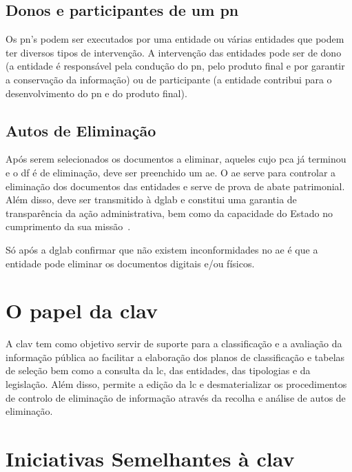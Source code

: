 \subsection{Donos e participantes de um \acrlong{pn}}

Os \acrshort{pn}'s podem ser executados por uma entidade ou várias entidades que podem ter diversos tipos de 
intervenção. A intervenção das entidades pode ser de dono (a entidade é responsável pela condução do \acrshort{pn}, 
pelo produto final e por garantir a conservação da informação) ou de participante (a entidade contribui para o 
desenvolvimento do \acrshort{pn} e do produto final).

\subsection{Autos de Eliminação}

Após serem selecionados os documentos a eliminar, aqueles cujo \acrshort{pca} já terminou e o \acrshort{df} é de 
eliminação, deve ser preenchido um \acrfull{ae}. O \acrshort{ae} serve para controlar a eliminação dos 
documentos das entidades e serve de prova de abate patrimonial. Além disso, deve ser transmitido à 
\acrshort{dglab} e constitui uma garantia de transparência da ação administrativa, bem como da capacidade do 
Estado no cumprimento da sua missão~\cite{pca}. 

Só após a \acrshort{dglab} confirmar que não existem 
inconformidades no \acrshort{ae} é que a entidade pode eliminar os documentos digitais e/ou físicos.

\section{O papel da \acrshort{clav}}

A \acrshort{clav} tem como objetivo servir de suporte para a classificação e a avaliação da informação pública 
ao facilitar a elaboração dos planos de classificação e tabelas de seleção bem como a consulta da \acrshort{lc}, 
das entidades, das tipologias e da legislação. Além disso, permite a edição da \acrshort{lc} e desmaterializar 
os procedimentos de controlo de eliminação de informação através da recolha e análise de autos de eliminação.

\section{Iniciativas Semelhantes à \acrshort{clav}}

